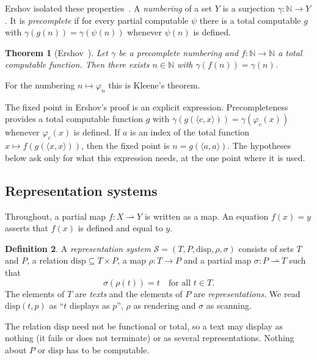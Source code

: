 \documentclass[11pt]{amsart}
\newtheorem{theorem}{Theorem}[section]
\theoremstyle{definition}
\newtheorem{definition}[theorem]{Definition}
\theoremstyle{remark}
\newcommand{\disp}{\mathrm{disp}}
\newcommand{\rend}{\rho}
\newcommand{\scan}{\sigma}
\newcommand{\pa}{\rightharpoonup}
\begin{document}
Ershov isolated these properties~\cite{Ershov73}. A \emph{numbering} of a set $Y$ is a surjection
$\gamma \colon \mathbb{N} \to Y$. It is \emph{precomplete} if for every partial computable
$\psi$ there is a total computable $g$ with $\gamma(g(n)) = \gamma(\psi(n))$ whenever $\psi(n)$ is
defined.

\begin{theorem}[Ershov~\cite{Ershov73}]\label{thm:ershov}
Let $\gamma$ be a precomplete numbering and $f \colon \mathbb{N} \to \mathbb{N}$ a total computable
function. Then there exists $n \in \mathbb{N}$ with $\gamma(f(n)) = \gamma(n)$.
\end{theorem}

For the numbering $n \mapsto \varphi_n$ this is Kleene's theorem.

The fixed point in Ershov's proof is an explicit expression. Precompleteness provides a total
computable function $g$ with $\gamma(g(\langle c,x \rangle)) =
\gamma(\varphi_c(x))$ whenever $\varphi_c(x)$ is defined. If $a$ is an index of the total function
$x \mapsto f(g(\langle x,x \rangle))$, then the fixed point is $n = g(\langle a,a \rangle)$. The
hypotheses below ask only for what this
expression needs, at the one point where it is used.

\subsection{Representation systems}

Throughout, a partial map $f \colon X \pa Y$ is written as a map. An equation $f(x) = y$ asserts
that $f(x)$ is defined and equal to $y$.

\begin{definition}\label{def:system}
A \emph{representation system} $\mathcal{S} = (T, P, \disp, \rend, \scan)$ consists of sets $T$ and
$P$, a relation $\disp \subseteq T \times P$, a map $\rend \colon T \to P$ and a partial map $\scan
\colon P \pa T$ such that
\[
  \scan(\rend(t)) = t \quad \text{for all } t \in T.
\]
The elements of $T$ are \emph{texts} and the elements of $P$ are \emph{representations}. We read
$\disp(t,p)$ as ``$t$ displays as $p$'', $\rend$ as rendering and $\scan$ as scanning.
\end{definition}

The relation $\disp$ need not be functional or total, so a text may display as nothing (it fails or
does not terminate) or as several representations. Nothing about $P$ or $\disp$ has to be
computable.
\end{document}
